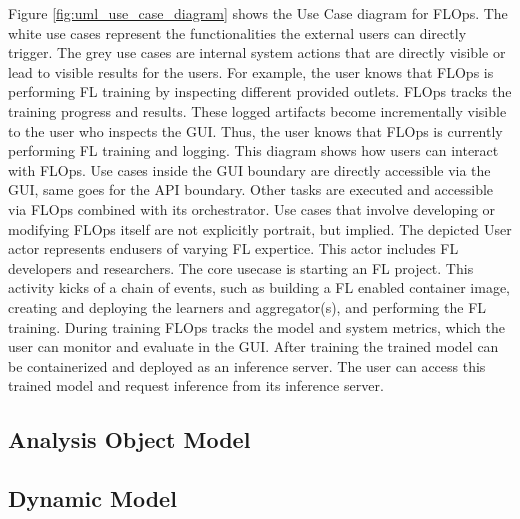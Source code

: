 Figure \ref{fig:uml_use_case_diagram} shows the Use Case diagram for FLOps.
The white use cases represent the functionalities the external users can directly trigger.
The grey use cases are internal system actions that are directly visible or lead to visible results for the users.
For example, the user knows that FLOps is performing FL training by inspecting different provided outlets.
FLOps tracks the training progress and results.
These logged artifacts become incrementally visible to the user who inspects the GUI.
Thus, the user knows that FLOps is currently performing FL training and logging.
This diagram shows how users can interact with FLOps.
Use cases inside the GUI boundary are directly accessible via the GUI, same goes for the API boundary.
Other tasks are executed and accessible via FLOps combined with its orchestrator.
Use cases that involve developing or modifying FLOps itself are not explicitly portrait, but implied.
The depicted User actor represents endusers of varying FL expertice.
This actor includes FL developers and researchers.
The core usecase is starting an FL project.
This activity kicks of a chain of events, such as building a FL enabled container image, creating and deploying the learners and aggregator(s), and performing the FL training.
During training FLOps tracks the model and system metrics, which the user can monitor and evaluate in the GUI.
After training the trained model can be containerized and deployed as an inference server.
The user can access this trained model and request inference from its inference server.



\subsection{Analysis Object Model}
\subsection{Dynamic Model}
